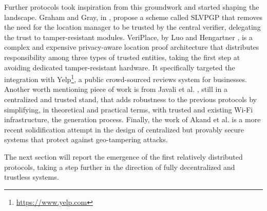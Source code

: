 Further protocols took inspiration from this groundwork and started shaping the landscape. Graham and Gray, in \cite{graham2009protecting}, propose a \pol{} scheme called SLVPGP that removes the need for the location manager to be trusted by the central verifier, delegating the trust to tamper-resistant modules. VeriPlace, by Luo and Hengartner \cite{luo2010veriplace}, is a complex and expensive privacy-aware location proof architecture that distributes responsibility among three types of trusted entities, taking the first step at avoiding dedicated tamper-resistant hardware. It specifically targeted the integration with Yelp\footnote{\url{https://www.yelp.com}}, a public crowd-sourced reviews system for businesses. Another worth mentioning piece of work is from Javali et al. \cite{javali2016alice}, still in a centralized and trusted stand, that adds robustness to the previous protocols by simplifying, in theoretical and practical terms, with trusted and existing Wi-Fi infrastructure, the \pol{} generation process. Finally, the work of Akand et al. \cite{akand2021privacy} is a more recent solidification attempt in the design of centralized but provably secure \pol{} systems that protect against geo-tampering attacks.

The next section will report the emergence of the first relatively distributed \pol{} protocols, taking a step further in the direction of fully decentralized and trustless systems.